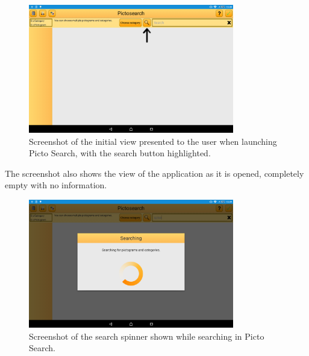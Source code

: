 \begin{figure}[ht]
    \centering
    \includegraphics[width=0.8\textwidth]{figures/img/screenshots/old_startup.png}
    \caption{Screenshot of the initial view presented to the user when launching Picto Search, with the search button highlighted.}\label{fig:screenshot_startup}
\end{figure}
\noindent
The screenshot also shows the view of the application as it is opened, completely empty with no information.

\begin{figure}[ht]
    \centering
    \includegraphics[width=0.8\textwidth]{figures/img/screenshots/old_dialog.png}
    \caption{Screenshot of the search spinner shown while searching in Picto Search.}\label{fig:screenshot_searchspinner}
\end{figure}

